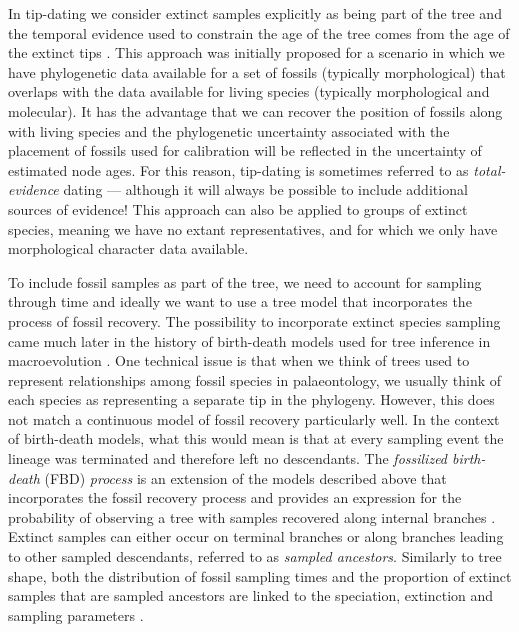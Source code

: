 \documentclass[11pt]{article}
\begin{document}
In tip-dating we consider extinct samples explicitly as being part of the tree and the temporal evidence used to constrain the age of the tree comes from the age of the extinct tips \cite{Ronquist2012a}.
This approach was initially proposed for a scenario in which we have phylogenetic data available for a set of fossils (typically morphological) that overlaps with the data available for living species (typically morphological and molecular). %
It has the advantage that we can recover the position of fossils along with  living species and the phylogenetic uncertainty associated with the placement of fossils used for calibration will be reflected in the uncertainty of estimated node ages. 
For this reason, tip-dating is sometimes referred to as \textit{total-evidence} dating --- although it will always be possible to include additional sources of evidence!
This approach can also be applied to groups of extinct species, meaning we have no extant representatives, and for which we only have morphological character data available.

To include fossil samples as part of the tree, we need to account for sampling through time and ideally we want to use a tree model that incorporates the process of fossil recovery.
The possibility to incorporate extinct species sampling came much later in the history of birth-death models used for tree inference in macroevolution \cite{Stadler2010}.
One technical issue is that when we think of trees used to represent relationships among fossil species in palaeontology, we usually think of each species as representing a separate tip in the phylogeny.
However, this does not match a continuous model of fossil recovery particularly well.
In the context of birth-death models, what this would mean is that at every sampling event the lineage was terminated and therefore left no descendants.
The \textit{fossilized birth-death} (FBD) \textit{process} is an extension of the models described above that incorporates the fossil recovery process and provides an expression for the probability of observing a tree with samples recovered along internal branches \cite{Stadler2010,Heath2014,Gavryushkina2014}.
Extinct samples can either occur on terminal branches or along branches leading to other sampled descendants, referred to as \textit{sampled ancestors}.
Similarly to tree shape, both the distribution of fossil sampling times and the proportion of extinct samples that are sampled ancestors are linked to the speciation, extinction and sampling parameters \cite{Gavryushkina2014}. 
\end{document}
